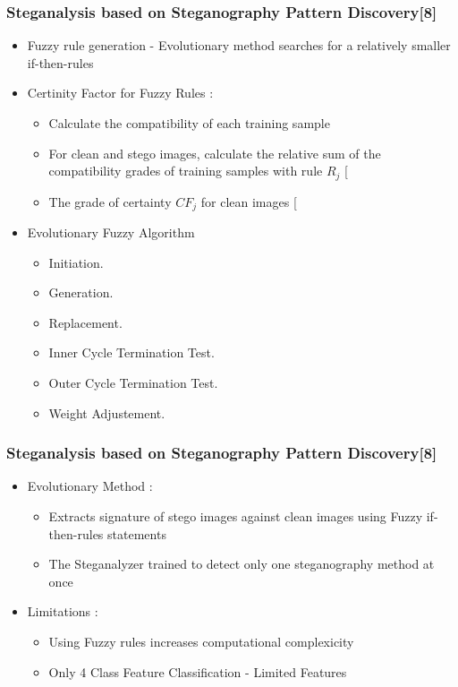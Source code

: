 \documentclass{beamer} %
\theoremstyle{definition} %
\begin{document}
\begin{frame}
\frametitle{Steganalysis based on Steganography Pattern Discovery[8]}
\begin{itemize}
	\item Fuzzy rule generation - Evolutionary method searches for a relatively smaller if-then-rules
	\item Certinity Factor for Fuzzy Rules : 
	\begin{itemize}
	    \item Calculate the compatibility of each training sample
	    \item For clean and stego images, calculate the relative sum of the compatibility grades of training samples with rule $R_j$ [ 
	    \item The grade of certainty $CF_j$ for clean images [ 
	\end{itemize}
    \item Evolutionary Fuzzy Algorithm 
    \begin{itemize}
    	\item Initiation.
    	\item Generation. 
    	\item Replacement. 
    	\item Inner Cycle Termination Test. 
    	\item Outer Cycle Termination Test. 
    	\item Weight Adjustement. 
    \end{itemize}
\end{itemize}
\end{frame}

\begin{frame}
\frametitle{Steganalysis based on Steganography Pattern Discovery[8] }
\begin{itemize}
		\item Evolutionary Method : 
		\begin{itemize}
			\item Extracts signature of stego images against clean images using Fuzzy if-then-rules statements 
			\item The Steganalyzer trained to detect only one steganography method at once 
		\end{itemize}
	    \item Limitations : 
	    \begin{itemize}
	    	\item Using Fuzzy rules increases computational complexicity  
	    	\item Only 4 Class Feature Classification - Limited Features  
	    \end{itemize}
\end{itemize}
\end{frame}
\end{document}
